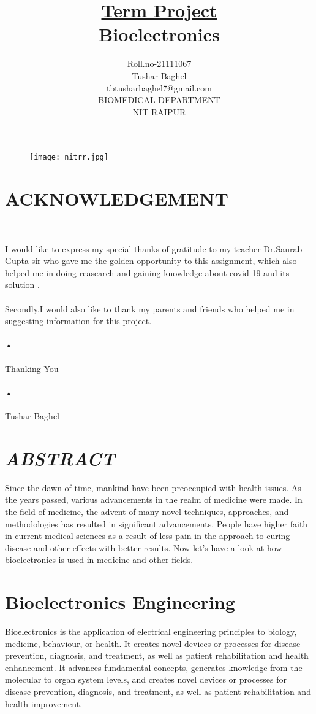 \documentclass[12pt]{report}
\title{\underline{Term Project} \\
Bioelectronics  }
\author{Roll.no-21111067\\Tushar Baghel\\tbtusharbaghel7@gmail.com\\BIOMEDICAL DEPARTMENT\\NIT RAIPUR\\}
\begin{document}
\begin{figure}
\centering
\texttt{[image: nitrr.jpg]}
\end{figure}
\maketitle
\clearpage
\tableofcontents
\clearpage

\section{ACKNOWLEDGEMENT}\


I would like to express my special thanks of gratitude to my teacher Dr.Saurab Gupta sir who gave me the golden opportunity to this assignment, which also helped me in doing reasearch and gaining knowledge about covid 19 and its solution .\paragraph{}

Secondly,I would also like to thank my parents and friends who helped me in suggesting information for this project.\paragraph{•}


Thanking You\paragraph{•}

Tushar Baghel 

\clearpage

\section{\textit{ABSTRACT}}

Since the dawn of time, mankind have been preoccupied with health issues. As the years passed, various advancements in the realm of medicine were made. In the field of medicine, the advent of many novel techniques, approaches, and methodologies has resulted in significant advancements. People have higher faith in current medical sciences as a result of less pain in the approach to curing disease and other effects with better results. Now let's have a look at how bioelectronics is used in medicine and other fields.



\section{Bioelectronics Engineering}
Bioelectronics is the application of electrical engineering principles to biology, medicine, behaviour, or health. It creates novel devices or processes for disease prevention, diagnosis, and treatment, as well as patient rehabilitation and health enhancement. It advances fundamental concepts, generates knowledge from the molecular to organ system levels, and creates novel devices or processes for disease prevention, diagnosis, and treatment, as well as patient rehabilitation and health improvement.
\clearpage
\end{document}
